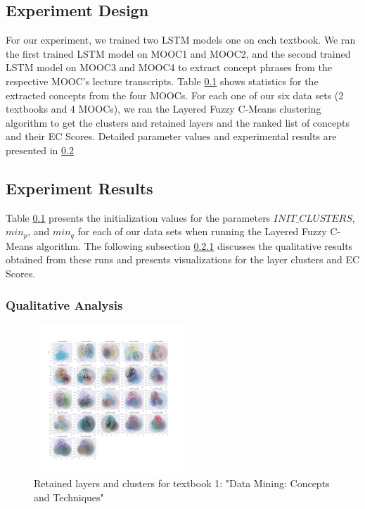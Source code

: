 
\subsection{Experiment Design}
For our experiment, we trained two LSTM models one on each textbook. We ran the first trained LSTM model on MOOC1 and MOOC2, and the second trained LSTM model on MOOC3 and MOOC4 to extract concept phrases from the respective MOOC's lecture transcripts. Table \ref{} shows statistics for the extracted concepts from the four MOOCs.
For each one of our six data sets (2 textbooks and 4 MOOCs), we ran the Layered Fuzzy C-Means clustering algorithm to get the clusters and retained layers and the ranked list of concepts and their EC Scores. Detailed parameter values and experimental results are presented in \ref{exp_results}

\subsection{Experiment Results}\label{exp_results}
Table \ref{} presents the initialization values for the parameters $INIT\_CLUSTERS$, $min_p$, and $min_q$ for each of our data sets when running the Layered Fuzzy C-Means algorithm. The following subsection \ref{qualitative} discusses the qualitative results obtained from these runs and presents visualizations for the layer clusters and EC Scores.

\subsubsection{Qualitative Analysis}\label{qualitative}

\begin{figure}[t]
	\includegraphics[width=0.5\textwidth, left]{figures/han_bidi_clusters_1.png}
	\caption{Retained layers and clusters for textbook 1: "Data Mining: Concepts and Techniques"}
	\label{han_clusters}
\end{figure}

